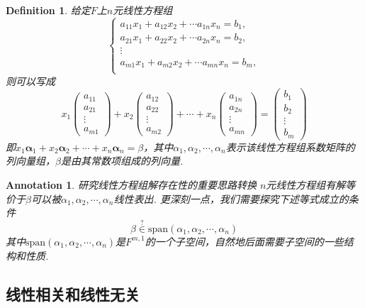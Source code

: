 \documentclass{article}
\newtheorem{definition}[theorem]{Definition}
\newtheorem{annotation}[theorem]{Annotation}
\newcommand{\mbf}[1]{\bm{#1}}
\begin{document}
\begin{definition}
\rm 给定$F$上$n$元线性方程组
$$
\left\{
\begin{array}{c}
a_{11}x_1 + a_{12}x_2 + \cdots a_{1n}x_n = b_1, \\
a_{21}x_1 + a_{22}x_2 + \cdots a_{2n}x_n = b_2, \\
\vdots \\
a_{m1}x_1 + a_{m2}x_2 + \cdots a_{mn}x_n = b_m, \\
\end{array} \right.
$$
则可以写成
$$
x_1 \begin{pmatrix}
a_{11} \\
a_{21} \\
\vdots \\
a_{m1} 
\end{pmatrix} + 
x_2 \begin{pmatrix}
a_{12} \\
a_{22} \\
\vdots \\
a_{m2} 
\end{pmatrix} +
\cdots +
x_n \begin{pmatrix}
a_{1n} \\
a_{2n} \\
\vdots \\
a_{mn}  
\end{pmatrix} = 
\begin{pmatrix}
b_1 \\
b_2 \\
\vdots \\
b_m  
\end{pmatrix} 
$$
即$x_1\mbf{\alpha}_1 + x_2\mbf{\alpha}_2 + \cdots + x_n\mbf{\alpha}_n = \beta $，其中${\alpha}_1,{\alpha}_2,\cdots,{\alpha}_n$表示该线性方程组系数矩阵的列向量组，$\beta$是由其常数项组成的列向量.
\end{definition}

\begin{annotation}
\rm {\color{red} 研究线性方程组解存在性的重要思路转换} $n$元线性方程组有解等价于$\beta$可以被${\alpha}_1,{\alpha}_2,\cdots,{\alpha}_n$线性表出. 更深刻一点，我们需要探究下述等式成立的条件
$$
\beta \overset{?}{\in} \text{span}({\alpha}_1,{\alpha}_2,\cdots,{\alpha}_n) 
$$
其中$\text{span}({\alpha}_1,{\alpha}_2,\cdots,{\alpha}_n)$是$F^{m,1}$的一个子空间，自然地后面需要子空间的一些结构和性质.
\end{annotation}

\subsection{线性相关和线性无关}
\end{document}
